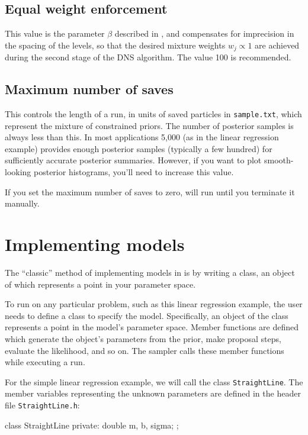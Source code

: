 \documentclass[article]{jss}
\begin{document}
\subsection{Equal weight enforcement}
This value is the parameter $\beta$ described in \citet{dnest}, and compensates
for imprecision in the spacing of the levels, so that the desired mixture
weights $w_j \propto 1$ are achieved during the second stage of the DNS
algorithm. The value 100 is recommended.

\subsection{Maximum number of saves}
This controls the length of a  run, in units of saved particles
in {\tt sample.txt}, which represent the mixture of constrained priors.
The number of posterior samples is always less than this. In most applications
5,000 (as in the linear regression example) provides enough posterior
samples (typically a few hundred) for sufficiently accurate posterior
summaries. However, if you want to plot smooth-looking posterior histograms,
you'll need to increase this value.

If you set the maximum number of saves to zero,  will run until
you terminate it manually.

\section{Implementing models}\label{sec:models}
The ``classic'' method of implementing models in  is by
writing a  class, an object of which represents a
point in your parameter space.

To run  on any particular problem, such as this linear regression
example, the user needs to define a  class to specify the
model. Specifically, an object of the class represents a point in the
model's parameter space. Member functions are defined which generate
the object's parameters from the prior, make proposal steps, evaluate the
likelihood, and so on. The sampler calls these member functions while
executing a run.

For the simple linear regression example, we will call the class
{\tt StraightLine}. The member variables representing the
unknown parameters are defined in the header file {\tt StraightLine.h}:

\begin{CodeChunk}
\begin{CodeInput}
class StraightLine
{
    private:
        double m, b, sigma;
};
\end{CodeInput}
\end{CodeChunk}
\end{document}

